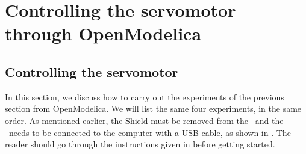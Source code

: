 \section{Controlling the servomotor through OpenModelica}
\subsection{Controlling the servomotor}
\label{sec:servo-OpenModelica}
In this section, we discuss how to carry out the experiments of the
previous section from OpenModelica.  We will list the same four experiments,
in the same order.  As mentioned earlier, the Shield must be removed from 
the \arduino\ and the \arduino\ needs to be connected to the computer 
with a USB cable, as shown in . The reader should go through the instructions given in
 before getting started.

